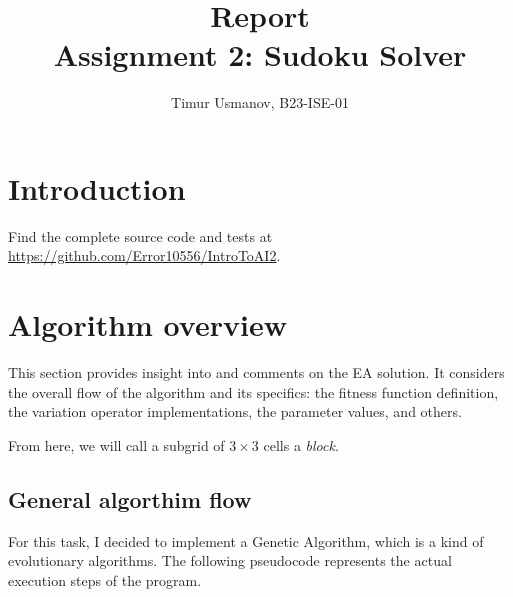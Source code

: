\documentclass[10pt]{article}
\begin{document}
\title{Report\\Assignment 2: Sudoku Solver}
\author{Timur Usmanov, B23-ISE-01}
\maketitle

\section{Introduction}
Find the complete source code and tests at \url{https://github.com/Error10556/IntroToAI2}.

\section{Algorithm overview}

This section provides insight into and comments on the EA solution. It considers
the overall flow of the algorithm and its specifics: the fitness function definition,
the variation operator implementations, the parameter values, and others.

From here, we will call a subgrid of $3\times3$ cells a \textit{block}.

\subsection{General algorthim flow}\label{flowlisting}

For this task, I decided to implement a Genetic Algorithm, which is a kind of evolutionary algorithms.
The following pseudocode represents the actual execution steps of the program.
\end{document}
